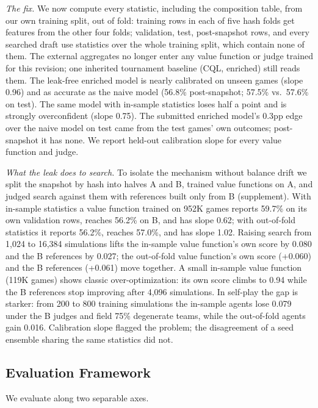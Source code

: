 \documentclass[journal]{IEEEtran}
\providecommand{\DIFaddtex}[1]{{\protect\color{blue} \sf #1}} %
\providecommand{\DIFdeltex}[1]{{\protect\color{red} \scriptsize #1}} %
\providecommand{\DIFaddend}{} %
\providecommand{\DIFdelbegin}{} %
\providecommand{\DIFdelend}{} %
\providecommand{\DIFadd}[1]{\texorpdfstring{\DIFaddtex{#1}}{#1}} %
\providecommand{\DIFdel}[1]{\texorpdfstring{\DIFdeltex{#1}}{}} %
\begin{document}
\DIFadd{\textit{The fix.} We now compute every statistic, including the composition table, from our own training split, out of fold: training rows in each of five hash folds get features from the other four folds; validation, test, post-snapshot rows, and every searched draft use statistics over the whole training split, which contain none of them. The external aggregates no longer enter any value function or judge trained for this revision; one inherited tournament baseline (CQL, enriched) still reads them. The leak-free enriched model is nearly calibrated on unseen games (slope 0.96) and as accurate as the naive model (56.8\% post-snapshot; 57.5\% vs.\ 57.6\% on test). The same model with in-sample statistics loses half a point and is strongly overconfident (slope 0.75). The submitted enriched model's 0.3pp edge over the naive model on test came from the test games' own outcomes; post-snapshot it has none. We report held-out calibration slope for every value function and judge.
}

\DIFadd{\textit{What the leak does to search.} To isolate the mechanism without balance drift we split the snapshot by hash into halves A and B, trained value functions on A, and judged search against them with references built only from B (supplement). With in-sample statistics a value function trained on 952K games reports 59.7\% on its own validation rows, reaches 56.2\% on B, and has slope 0.62; with out-of-fold statistics it reports 56.2\%, reaches 57.0\%, and has slope 1.02. Raising search from 1,024 to 16,384 simulations lifts the in-sample value function's own score by 0.080 and the B references by 0.027; the out-of-fold value function's own score (+0.060) and the B references (+0.061) move together. A small in-sample value function (119K games) shows classic over-optimization: its own score climbs to 0.94 while the B references stop improving after 4,096 simulations. In self-play the gap is starker: from 200 to 800 training simulations the in-sample agents lose 0.079 under the B judges and field 75\% degenerate teams, while the out-of-fold agents gain 0.016. Calibration slope flagged the problem; the disagreement of a seed ensemble sharing the same statistics did not.
}

\DIFaddend \subsection{Evaluation\DIFdelbegin \DIFdel{Framework}\DIFdelend }
\label{sec:eval}

\DIFdelbegin \DIFdel{We evaluate along two separable axes.
}%
\end{document}
